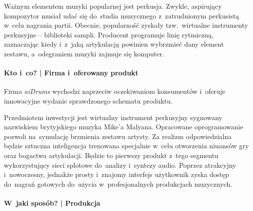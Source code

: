 \documentclass[12pt]{article}
\newcommand{\nazwafirmy}{aiDrums\xspace}
\begin{document}
Ważnym elementem muzyki popularnej jest perkusja.
Zwykle, aspirujący kompozytor musiał udać się do~studia muzycznego z~zatrudnionym perkusistą w~celu nagrania partii.
Obecnie, popularność zyskały tzw.~wirtualne instrumenty perkusyjne -- biblioteki sampli.
Producent programuje linię rytmiczną, zaznaczając kiedy i~z~jaką artykulacją powinien wybrzmieć dany element zestawu, a~odegraniem muzyki zajmuje się komputer.


\paragraph{Kto i~co? | Firma i~oferowany produkt}

Firma \textit{\nazwafirmy} wychodzi naprzeciw oczekiwaniom konsumentów i~oferuje innowacyjne wydanie sprawdzonego schematu produktu.

Przedmiotem inwestycji jest wirtualny instrument perkusyjny sygnowany nazwiskiem brytyjskiego muzyka Mike'a Malyana.
Opracowane oprogramowanie pozwoli na~symulację brzmienia zestawu artysty.
Za realizm odpowiedzialna będzie sztuczna inteligencja trenowana specjalnie w~celu otworzenia niuansów gry oraz bogactwa artykulacji.
Będzie to pierwszy produkt z~tego segmentu wykorzystujący sieci splotowe do~analizy i~syntezy audio.
Poprzez atrakcyjny i~nowoczesny, jednakże prosty i~znajomy interfejs użytkownik zyska dostęp do~nagrań gotowych do~użycia w~profesjonalnych produkcjach muzycznych.

\paragraph{W~jaki sposób? | Produkcja}
\end{document}
